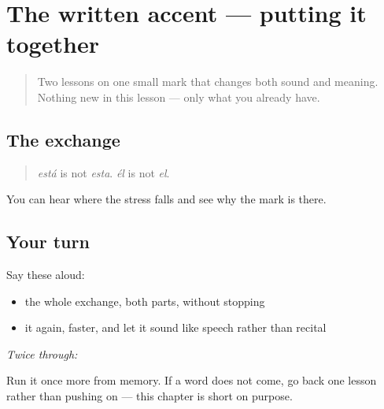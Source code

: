 \section[Practice]{The written accent — putting it together}

\label{lesson:ES-W01-repaso-acento}



\begin{quote}
Two lessons on one small mark that changes both sound and meaning. Nothing new in this lesson — only what you already have.
\end{quote}

\subsection*{The exchange}
\begin{quote}
\emph{está} is not \emph{esta}. \emph{él} is not \emph{el}.
\end{quote}

\begin{grammarlens}[title={What you've built}]
You can hear where the stress falls and see why the mark is there.
\end{grammarlens}

\subsection*{Your turn}
Say these aloud:

\begin{itemize}
\raggedright
  \item the whole exchange, both parts, without stopping
  \item it again, faster, and let it sound like speech rather than recital
\end{itemize}

\emph{Twice through:}

\begin{tcolorbox}[breakable,colback=teal!4,colframe=teal!35!black,title={Before you move on}]
Run it once more from memory. If a word does not come, go back one lesson rather than pushing on — this chapter is short on purpose.
\end{tcolorbox}
